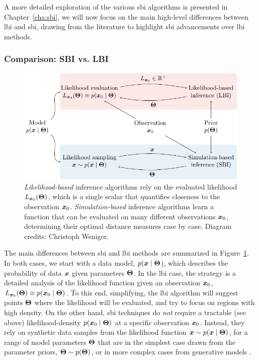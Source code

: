 A more detailed exploration of the various \gls*{sbi} algorithms is presented in Chapter~\ref{cha:sbi}, we will now focus on the main high-level differences between \gls*{lbi} and \gls*{sbi}, drawing from the literature to highlight \gls*{sbi} advancements over \gls*{lbi} methods.


\subsubsection{Comparison: SBI vs. LBI}

\begin{figure}
	\centering
	\includegraphics[width=\linewidth]{TikZ/lbi_vs_sbi.pdf}
	\caption{\emph{Likelihood-based} inference algorithms rely on the evaluated likelihood  $L_{\bm{x}_0}(\bm{\Theta}) $, which is a single scalar that quantifies closeness to the observation $\bm{x}_0$. \emph{Simulation-based} inference algorithms learn a function that can be evaluated on many different observations $\bm{x}_0$, determining their optimal distance measures case by case. Diagram credits: Christoph Weniger.}
	\label{fig:SBIvsLBI}
\end{figure}

The main differences between \gls*{sbi} and \gls*{lbi} methods are summarized in Figure~\ref{fig:SBIvsLBI}. In both cases, we start with a data model, $p(\bm{x}\mid\bm{\Theta}$), which describes the probability of data $\bm{x}$ given parameters $\bm{\Theta}$. In the \gls*{lbi} case, the strategy is a detailed analysis of the likelihood function given an observation $\bm{x}_0$, $L_{\bm{x}_0}(\bm{\Theta})\equiv p(\bm{x}_0\mid\bm{\Theta})$. To this end, simplifying, the \gls*{lbi} algorithm will suggest points $\bm{\Theta}$ where the likelihood will be evaluated, and try to focus on regions with high density. On the other hand, \gls*{sbi} techniques do \emph{not} require a tractable (see above) likelihood-density $p(\bm{x}_0\mid\bm{\Theta})$ at a specific observation $\bm{x}_0$. Instead, they rely on synthetic data samples from the likelihood function $\bm{x} \sim p(\bm{x}\mid\bm{\Theta})$, for a range of model parameters $\bm{\Theta}$ that are in the simplest case drawn from the parameter priors, $\bm{\Theta} \sim p(\bm{\Theta})$, or in more complex cases from generative models \cite[\eg][]{Karchev:2022aa}. %


